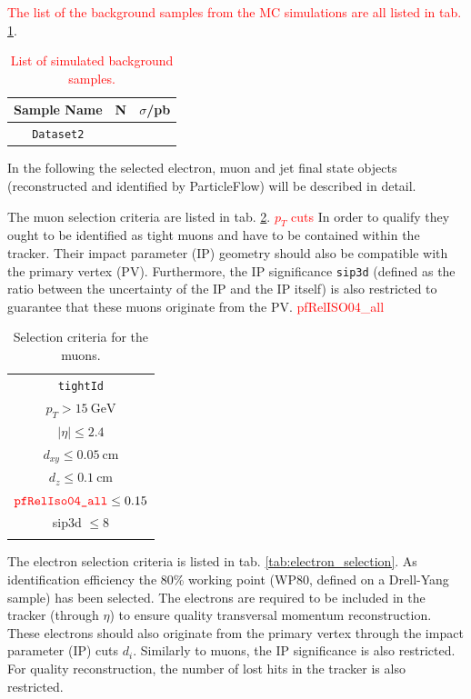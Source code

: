 \textcolor{red}{The list of the background samples from the MC simulations are all listed in tab. \ref{tab:bkg_datasets}}.

\begin{table}[h!]
	\centering
	\begin{tabular}{ccc}
		Sample Name & N & $\sigma$/pb \\
		\hline
		\texttt{Dataset2} & & \\
	\end{tabular}
	\caption{\textcolor{red}{List of simulated background samples.}}
	\label{tab:bkg_datasets}
\end{table}


In the following the selected electron, muon and jet final state objects (reconstructed and identified by ParticleFlow) will be described in detail.

The muon selection criteria are listed in tab. \ref{tab:muon_selection}. \textcolor{red}{$p_T$ cuts} In order to qualify they ought to be identified as tight muons and have to be contained within the tracker. Their impact parameter (IP) geometry should also be compatible with the primary vertex (PV). Furthermore, the IP significance \texttt{sip3d} (defined as the ratio between the uncertainty of the IP and the IP itself) is also restricted to guarantee that these muons originate from the PV. \textcolor{red}{pfRelISO04\_all}

\begin{table}[h!]
	\centering
	\begin{tabular}{c}
		\hline
		\texttt{tightId} \\
		$p_T > \SI{15}{\giga\electronvolt}$ \\
		$|\eta| \leq 2.4$ \\
		$d_{xy} \leq \SI{0.05}{\centi\meter}$ \\
		$d_z \leq \SI{0.1}{\centi\meter}$ \\
		$\textcolor{red}{\texttt{pfRelIso04\_all}} \leq 0.15$  \\
		sip3d $\leq 8$ \\
		\hline \\
	\end{tabular}
	\caption{Selection criteria for the muons.}
	\label{tab:muon_selection}
\end{table}

The electron selection criteria is listed in tab. \ref{tab:electron_selection}. As identification efficiency the 80\% working point (WP80, defined on a Drell-Yang sample) has been selected. The electrons are required to be included in the tracker (through $\eta$) to ensure quality transversal momentum reconstruction. These electrons should also originate from the primary vertex through the impact parameter (IP) cuts $d_i$. Similarly to muons, the IP significance is also restricted. For quality reconstruction, the number of lost hits in the tracker is also restricted. 

